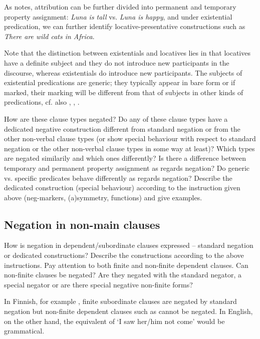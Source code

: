 \documentclass[output=paper,colorlinks,citecolor=brown]{langscibook}
\begin{document}
As \citet{Veselinova2015} notes, attribution can be further divided into permanent and temporary property assignment: \textit{Luna is tall} vs. \textit{Luna is happy}, and under existential predication, we can further identify locative-presentative constructions such as \textit{There are wild cats in Africa}. 


Note that the distinction between existentials and locatives lies in that locatives have a definite subject and they do not introduce new participants in the discourse, whereas existentials do introduce new participants. The subjects of existential predications are generic; they typically appear in bare form or if marked, their marking will be different from that of subjects in other kinds of predications, cf. also \citet{Dryer2007}, \citet{Veselinova2013lexicalization}, \citet{McNally2016}. 


How are these clause types negated? Do any of these clause types have a dedicated negative construction different from standard negation or from the other non-verbal clause types (or show special behaviour with respect to standard negation or the other non-verbal clause types in some way at least)? Which types are negated similarily and which ones differently? Is there a difference between temporary and permanent property assignment as regards negation? Do generic vs. specific predicates behave differently as regards negation? Describe the dedicated construction (special behaviour) according to the instruction given above (neg-markers, (a)symmetry, functions) and give examples.

\subsection{Negation in non-main clauses}\label{sec:quest:2.4}

How is negation in dependent/subordinate clauses expressed – standard negation or dedicated constructions? Describe the constructions according to the above instructions. Pay attention to both finite and non-finite dependent clauses. Can non-finite clauses be negated? Are they negated with the standard negator, a special negator or are there special negative non-finite forms?


In Finnish, for example , finite subordinate clauses are negated by standard negation but non-finite dependent clauses such as  cannot be negated. In English, on the other hand, the equivalent of  ‘I saw her/him not come’ would be grammatical. %
\end{document}
